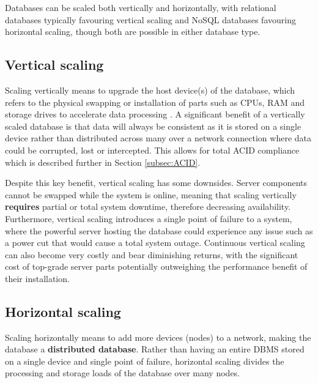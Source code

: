 \para Databases can be scaled both vertically and horizontally, with relational databases typically favouring vertical scaling and NoSQL 
databases favouring horizontal scaling, though both are possible in either database type. 

\subsection{Vertical scaling}
Scaling vertically means to upgrade the host device(s) of the database, which refers to the physical swapping or installation of 
parts such as CPUs, RAM and storage drives to accelerate data processing \autocite{cattellScalableSQLNoSQL2011}. 
A significant benefit of a vertically scaled database is that data will always be consistent as it is stored on a single device rather than
distributed across many over a network connection where data could be corrupted, lost or intercepted. This allows for total ACID compliance which is described further in Section \ref{subsec:ACID}. 

\para Despite this key benefit, vertical scaling has some downsides. Server components cannot be swapped while the system is online, meaning 
that scaling vertically \textbf{requires} partial or total system downtime, therefore decreasing availability. Furthermore, vertical scaling 
introduces a single point of failure to a system, where the powerful server hosting the database could experience any issue such as a power cut 
that would cause a total system outage. Continuous vertical scaling can also become very costly and bear diminishing returns, with the 
significant cost of top-grade server parts potentially outweighing the performance benefit of their installation.  


\subsection{Horizontal scaling}


Scaling horizontally means to add more devices (nodes) to a network, making the database a \textbf{distributed database}. Rather 
than having an entire DBMS stored on a single device and single point of failure, horizontal scaling divides the processing and storage 
loads of the database over many nodes. 




